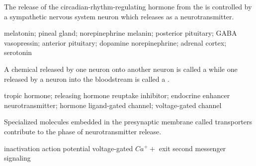 \documentclass[answers]{exam}
\begin{document}
\begin{questions}

\question The release of the circadian-rhythm-regulating hormone \fillin from the \fillin is controlled by a sympathetic nervous system neuron which releases \fillin as a neurotransmitter.
\begin{choices}
\correctchoice melatonin; pineal gland; norepinephrine
\choice melanin; posterior pituitary; GABA
\choice vasopressin; anterior pituitary; dopamine
\choice norepinephrine; adrenal cortex; serotonin
\end{choices}


\question A chemical released by one neuron onto another neuron is called a \fillin while one released by a neuron into the bloodstream is called a \fillin.
\begin{choices}
\choice tropic hormone; releasing hormone
\choice reuptake inhibitor; endocrine enhancer
\correctchoice neurotransmitter; hormone
\choice ligand-gated channel; voltage-gated channel
\end{choices}


\question Specialized molecules embedded in the presynaptic membrane called transporters contribute to the \fillin phase of neurotransmitter release.
\begin{choices}
\correctchoice inactivation
\choice action potential
\choice voltage-gated $Ca^++$ exit
\choice second messenger signaling
\end{choices}


\end{questions}
\end{document}
